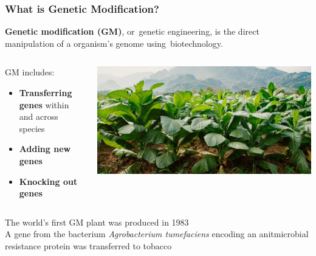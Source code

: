 \documentclass[xcolor=dvipsnames]{beamer}
\newcommand{\forceindent}{\leavevmode{\parindent=1em\indent}}
\begin{document}
\begin{frame}
	\frametitle{What is Genetic Modification?}
	\textbf{Genetic modification (GM)}, or genetic engineering, is the direct manipulation of a organism's genome using biotechnology. \\
	\vspace{10pt}
	\begin{columns}
		\begin{column}{0.45\textwidth}
	
\vspace{10pt}
GM includes:

\begin{itemize}
\item \textbf{Transferring genes} within and across species
\item \textbf{Adding new genes} 
\item \textbf{Knocking out genes} 
\end{itemize}
\vspace{15pt}


\end{column}
\begin{column}{0.55\textwidth}
		\includegraphics[keepaspectratio, width  = \textwidth]{img/tobacco}		
\end{column}
\end{columns}

The world's first GM plant was produced in 1983\\

\forceindent A gene from the bacterium \textit{Agrobacterium tumefaciens} encoding an anitmicrobial resistance protein was transferred to tobacco


	
\end{frame}
\end{document}

